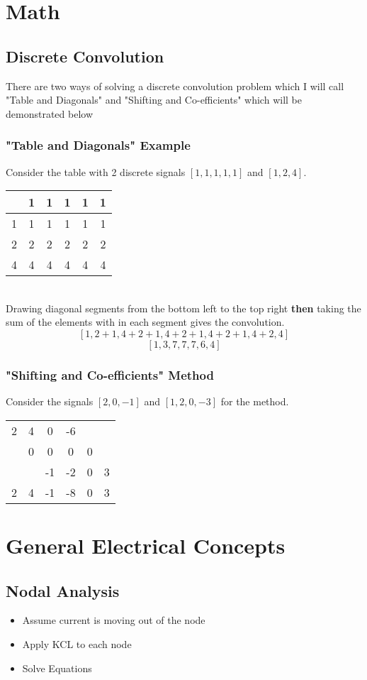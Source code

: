 \documentclass{article}
\begin{document}
\section*{Math}
\subsection*{Discrete Convolution}
There are two ways of solving a discrete convolution problem which I will call "Table and Diagonals" and "Shifting and Co-efficients" which will be demonstrated below
\subsubsection*{"Table and Diagonals" Example}
Consider the table with 2 discrete signals $ [1,1,1,1,1] $ and $ [1,2,4] $.\\
\begin{tabular}{c|ccccc}
	&1&1&1&1&1\\
	\hline
	1&1&1&1&1&1\\
	2&2&2&2&2&2\\
	4&4&4&4&4&4
\end{tabular}\\
Drawing diagonal segments from the bottom left to the top right \textbf{then} taking the sum of the elements with in each segment gives the convolution.
\[ [1, 2+1, 4+2+1, 4+2+1, 4+2+1, 4+2, 4] \]
\[ [1, 3, 7, 7, 7, 6, 4] \]
\subsubsection*{"Shifting and Co-efficients" Method}
Consider the signals $ [2,0,-1] $ and $ [1, 2, 0, -3] $ for the method.\\
\begin{tabular}{cccccc}
	2&4&0&-6&&\\
	&0&0&0&0&\\
	&&-1&-2&0&3\\
	\hline
	2&4&-1&-8&0&3
\end{tabular}
\section*{General Electrical Concepts}
\subsection*{Nodal Analysis}
\begin{itemize}
\item Assume current is moving out of the node
\item Apply KCL to each node
\item Solve Equations
\end{itemize}
\end{document}

